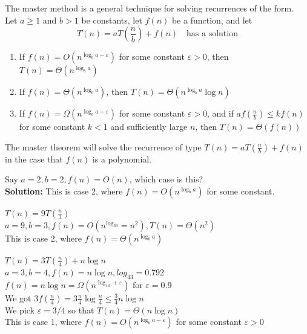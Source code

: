 \begin{definition}
    \label{def:master_method}
    The master method is a general technique for solving recurrences of the form. \\
    Let $a \geq 1$ and $b > 1$ be constants, let $f(n)$ be a function, and let
    \[
        T(n) = aT\left(\frac{n}{b}\right) + f(n) \quad \text{has a solution}
    \]
    \begin{enumerate}
        \item If $f(n) = O(n^{\log_b a - \varepsilon})$ for some constant $\varepsilon > 0$, then $T(n) = \Theta(n^{\log_b a})$
        \item If $f(n) = \Theta(n^{\log_b a})$, then $T(n) = \Theta(n^{\log_b a} \log n)$
        \item If $f(n) = \Omega(n^{\log_b a + \varepsilon})$ for some constant $\varepsilon > 0$, and if $a f\left(\frac{n}{b}\right) \leq k f(n)$ for some constant $k < 1$ and sufficiently large $n$, then $T(n) = \Theta(f(n))$
    \end{enumerate}
    The master theorem will solve the recurrence of type $T(n) = aT\left(\frac{n}{b}\right) + f(n)$ in the case that $f(n)$ is a polynomial.
\end{definition}

\begin{example}
    Say $ a = 2, b = 2, f(n) = O(n)$, which case is this?\\
    \textbf{Solution:} This is case 2, where $f(n) = O(n^{\log_b a})$ for some constant.\\
\end{example}

\begin{example}
    $T(n) = 9T\left(\frac{n}{3}\right)$ \\
    $a = 9, b = 3, f(n) = O(n^{\log_39} = n^{2}), T(n) = \Theta(n^2)$\\
    This is case 2, where $f(n) = \Theta(n^{\log_b a})$
\end{example}

\begin{example}
    $T(n) = 3T\left(\frac{n}{4}\right) + n\log n$ \\
    $a = 3, b = 4, f(n) = n\log n, log_43 = 0.792$\\
    $f(n) = n\log n = \Omega(n^{\log_43 + \varepsilon})$ for $\varepsilon = 0.9$\\
    We got $3f(\frac{n}{4}) = 3\frac{n}{4}\log\frac{n}{4} \leq \frac{3}{4}n\log n$\\
    We pick $\varepsilon = 3/4$ so that $T(n) = \Theta(n\log n)$\\
    This is case 1, where $f(n) = O(n^{\log_b a - \varepsilon})$ for some constant $\varepsilon > 0$
\end{example}

